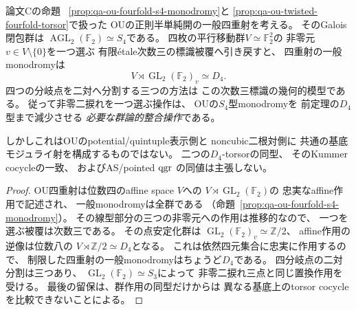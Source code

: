 \begin{proposition}[OU四重射の次数三標識後のモノドロミー]
\label{prop:qa-ou-fourfold-dihedral-restriction}
論文Cの命題~
\ref{prop:qa-ou-fourfold-s4-monodromy}と
\ref{prop:qa-ou-twisted-fourfold-torsor}で扱った
OUの正則半単純開の一般四重射を考える。
そのGalois閉包群は
$\operatorname{AGL}_2(\mathbb F_2)\simeq S_4$である。
四枚の平行移動群$V\simeq\mathbb F_2^2$の
非零元$v\in V\setminus\{0\}$を一つ選ぶ
有限\'{e}tale次数三の標識被覆へ引き戻すと、
四重射の一般monodromyは
\begin{equation}
 V\rtimes\operatorname{GL}_2(\mathbb F_2)_v
 \simeq D_4 .
 \label{eq:qa-ou-dihedral-reduction}
\end{equation}
四つの分岐点を二対へ分割する三つの方法は
この次数三標識の幾何的模型である。
従って非零二捩れを一つ選ぶ操作は、
OUの$S_4$型monodromyを
前定理の$D_4$型まで減少させる
\emph{必要な群論的整合操作}である。

しかしこれはOUのpotential/quintuple表示側と
noncubic二根対側に
共通の基底モジュライ射を構成するものではない。
二つの$D_4$-torsorの同型、
そのKummer cocycleの一致、
およびAS/pointed $\operatorname{qgr}$ の同値は主張しない。
\end{proposition}
\begin{proof}
OU四重射は位数四のaffine space $V$への
$V\rtimes\operatorname{GL}_2(\mathbb F_2)$の
忠実なaffine作用で記述され、
一般monodromyは全群である
（命題~\ref{prop:qa-ou-fourfold-s4-monodromy}）。
その線型部分の三つの非零元への作用は推移的なので、
一つを選ぶ被覆は次数三である。
その点安定化群は
$\operatorname{GL}_2(\mathbb F_2)_v\simeq\mathbb Z/2$、
affine作用の逆像は位数八の
$V\rtimes\mathbb Z/2\simeq D_4$となる。
これは依然四元集合に忠実に作用するので、
制限した四重射の一般monodromyはちょうど$D_4$である。
四分岐点の二対分割は三つあり、
$\operatorname{GL}_2(\mathbb F_2)\simeq S_3$によって
非零二捩れ三点と同じ置換作用を受ける。
最後の留保は、群作用の同型だけからは
異なる基底上のtorsor cocycleを比較できないことによる。
\end{proof}

